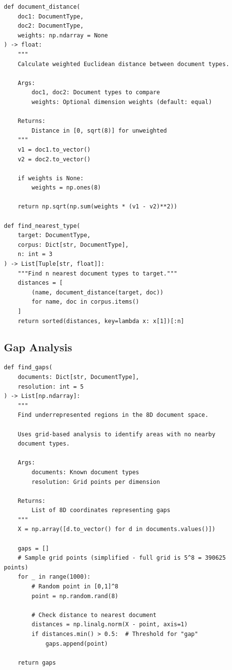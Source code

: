 \begin{verbatim}
def document_distance(
    doc1: DocumentType,
    doc2: DocumentType,
    weights: np.ndarray = None
) -> float:
    """
    Calculate weighted Euclidean distance between document types.

    Args:
        doc1, doc2: Document types to compare
        weights: Optional dimension weights (default: equal)

    Returns:
        Distance in [0, sqrt(8)] for unweighted
    """
    v1 = doc1.to_vector()
    v2 = doc2.to_vector()

    if weights is None:
        weights = np.ones(8)

    return np.sqrt(np.sum(weights * (v1 - v2)**2))

def find_nearest_type(
    target: DocumentType,
    corpus: Dict[str, DocumentType],
    n: int = 3
) -> List[Tuple[str, float]]:
    """Find n nearest document types to target."""
    distances = [
        (name, document_distance(target, doc))
        for name, doc in corpus.items()
    ]
    return sorted(distances, key=lambda x: x[1])[:n]
\end{verbatim}

\subsection{Gap Analysis}

\begin{verbatim}
def find_gaps(
    documents: Dict[str, DocumentType],
    resolution: int = 5
) -> List[np.ndarray]:
    """
    Find underrepresented regions in the 8D document space.

    Uses grid-based analysis to identify areas with no nearby
    document types.

    Args:
        documents: Known document types
        resolution: Grid points per dimension

    Returns:
        List of 8D coordinates representing gaps
    """
    X = np.array([d.to_vector() for d in documents.values()])

    gaps = []
    # Sample grid points (simplified - full grid is 5^8 = 390625 points)
    for _ in range(1000):
        # Random point in [0,1]^8
        point = np.random.rand(8)

        # Check distance to nearest document
        distances = np.linalg.norm(X - point, axis=1)
        if distances.min() > 0.5:  # Threshold for "gap"
            gaps.append(point)

    return gaps
\end{verbatim}


